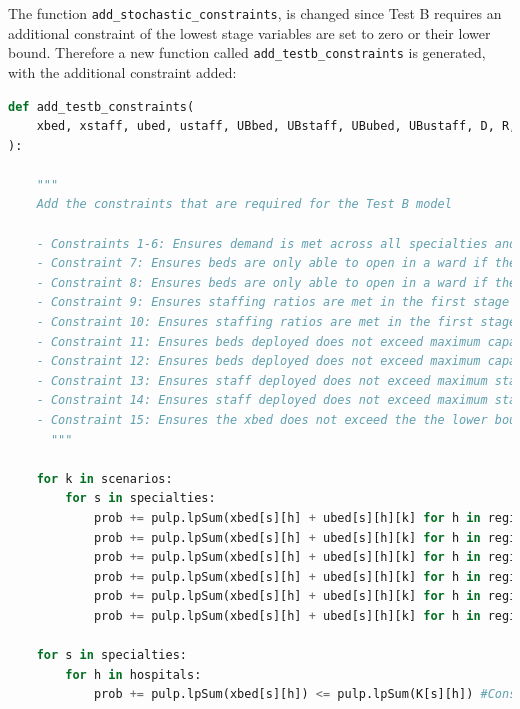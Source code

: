 \documentclass[../thesis.tex]{subfiles}
\begin{document}
The function \texttt{add\_stochastic\_constraints}, is changed since Test B requires an additional constraint of the lowest stage variables are set to zero or their lower bound.
Therefore a new function called \texttt{add\_testb\_constraints} is generated, with the additional constraint added:

\begin{lstlisting}[language=python]
def add_testb_constraints(
    xbed, xstaff, ubed, ustaff, UBbed, UBstaff, UBubed, UBustaff, D, R, K, prob, sh, shb, shk, srhk, sbhk, TESTB
):
    
    """
    Add the constraints that are required for the Test B model
    
    - Constraints 1-6: Ensures demand is met across all specialties and all regions
    - Constraint 7: Ensures beds are only able to open in a ward if the facilities are able to be opened - 1st stage
    - Constraint 8: Ensures beds are only able to open in a ward if the facilities are able to be opened - 2nd stage
    - Constraint 9: Ensures staffing ratios are met in the first stage
    - Constraint 10: Ensures staffing ratios are met in the first stage
    - Constraint 11: Ensures beds deployed does not exceed maximum capacity of hospital - 1st stage
    - Constraint 12: Ensures beds deployed does not exceed maximum capacity of hospital - 2nd stage
    - Constraint 13: Ensures staff deployed does not exceed maximum staffing resources - 1st stage
    - Constraint 14: Ensures staff deployed does not exceed maximum staffing resources - 2nd stage
    - Constraint 15: Ensures the xbed does not exceed the the lower bound of the deterministic model
      """
        
    for k in scenarios:
        for s in specialties:
            prob += pulp.lpSum(xbed[s][h] + ubed[s][h][k] for h in region1) >= pulp.lpSum(D[s][0][k]) #Constraint 1
            prob += pulp.lpSum(xbed[s][h] + ubed[s][h][k] for h in region2) >= pulp.lpSum(D[s][1][k]) #Constraint 2
            prob += pulp.lpSum(xbed[s][h] + ubed[s][h][k] for h in region3) >= pulp.lpSum(D[s][2][k]) #Constraint 3
            prob += pulp.lpSum(xbed[s][h] + ubed[s][h][k] for h in region4) >= pulp.lpSum(D[s][3][k]) #Constraint 4
            prob += pulp.lpSum(xbed[s][h] + ubed[s][h][k] for h in region5) >= pulp.lpSum(D[s][4][k]) #Constraint 5
            prob += pulp.lpSum(xbed[s][h] + ubed[s][h][k] for h in region6) >= pulp.lpSum(D[s][5][k]) #Constraint 6 
                  
    for s in specialties:
        for h in hospitals:
            prob += pulp.lpSum(xbed[s][h]) <= pulp.lpSum(K[s][h]) #Constraint 7
            

\end{lstlisting}
\end{document}
